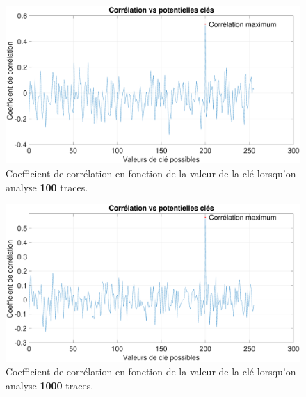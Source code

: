\documentclass[oneside]{book}
\begin{document}
\begin{figure}[htbp]
    \centering
    \hspace{-1.2 cm}
    \includegraphics[scale=0.25]{image/100.eps}    \caption{Coefficient de corrélation en fonction de la valeur de la clé lorsqu'on analyse \textbf{100} traces.}    \label{fig:100}
\end{figure}

\begin{figure}[htbp]
    \centering
    \hspace{-1.2 cm}   
    \includegraphics[scale=0.25]{image/1000.eps}    \caption{Coefficient de corrélation en fonction de la valeur de la clé lorsqu'on analyse \textbf{1000} traces.}    \label{fig:1000}
\end{figure}

\newpage
\end{document}
